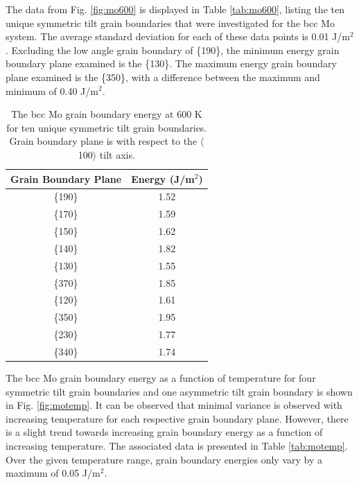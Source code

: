 \documentclass[review]{elsarticle}
\begin{document}
\FloatBarrier

The data from Fig. \ref{fig:mo600} is displayed in Table \ref{tab:mo600}, listing the ten unique symmetric tilt grain boundaries that were investigated for the bcc Mo system. The average standard deviation for each of these data points is 0.01 J/m$^{2}$. Excluding the low angle grain boundary of \{190\}, the minimum energy grain boundary plane examined is the \{130\}. The maximum energy grain boundary plane examined is the \{350\}, with a difference between the maximum and minimum of 0.40 J/m$^{2}$.

\begin{table}[h]
\caption{The bcc Mo grain boundary energy at 600 K for ten unique symmetric tilt grain boundaries. Grain boundary plane is with respect to the $\langle$100$\rangle$ tilt axis.} \label{tab:mo600}
\begin{center}
\begin{tabular}{|c|c|}
	\hline
	Grain Boundary Plane & Energy (J/m$^{2}$) \\
	 \hline
	 \{190\} & 1.52 \\
	 \{170\} & 1.59 \\
	 \{150\} & 1.62 \\
	 \{140\} & 1.82 \\
	 \{130\} & 1.55 \\	 
	 \{370\} & 1.85 \\
	 \{120\} & 1.61 \\
	 \{350\} & 1.95 \\
	 \{230\} & 1.77 \\
	 \{340\} & 1.74 \\
	 \hline
\end{tabular}
\end{center}
\label{default}
\end{table}

\FloatBarrier

The bcc Mo grain boundary energy as a function of temperature for four symmetric tilt grain boundaries and one asymmetric tilt grain boundary is shown in Fig. \ref{fig:motemp}. It can be observed that minimal variance is observed with increasing temperature for each respective grain boundary plane. However, there is a slight trend towards increasing grain boundary energy as a function of increasing temperature. The associated data is presented in Table \ref{tab:motemp}. Over the given temperature range, grain boundary energies only vary by a maximum of 0.05 J/m$^{2}$.
\end{document}

